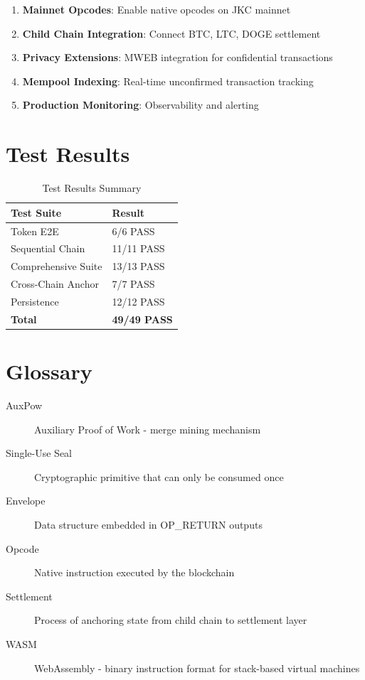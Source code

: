 \documentclass[a4paper,11pt]{article}
\begin{document}
\begin{enumerate}
    \item \textbf{Mainnet Opcodes}: Enable native opcodes on JKC mainnet
    \item \textbf{Child Chain Integration}: Connect BTC, LTC, DOGE settlement
    \item \textbf{Privacy Extensions}: MWEB integration for confidential transactions
    \item \textbf{Mempool Indexing}: Real-time unconfirmed transaction tracking
    \item \textbf{Production Monitoring}: Observability and alerting
\end{enumerate}

\appendix

\section{Test Results}

\begin{table}[h]
\centering
\begin{tabular}{@{}ll@{}}
\toprule
\textbf{Test Suite} & \textbf{Result} \\
\midrule
Token E2E & 6/6 PASS \\
Sequential Chain & 11/11 PASS \\
Comprehensive Suite & 13/13 PASS \\
Cross-Chain Anchor & 7/7 PASS \\
Persistence & 12/12 PASS \\
\midrule
\textbf{Total} & \textbf{49/49 PASS} \\
\bottomrule
\end{tabular}
\caption{Test Results Summary}
\end{table}

\section{Glossary}

\begin{description}
    \item[AuxPow] Auxiliary Proof of Work - merge mining mechanism
    \item[Single-Use Seal] Cryptographic primitive that can only be consumed once
    \item[Envelope] Data structure embedded in OP\_RETURN outputs
    \item[Opcode] Native instruction executed by the blockchain
    \item[Settlement] Process of anchoring state from child chain to settlement layer
    \item[WASM] WebAssembly - binary instruction format for stack-based virtual machines
\end{description}
\end{document}
